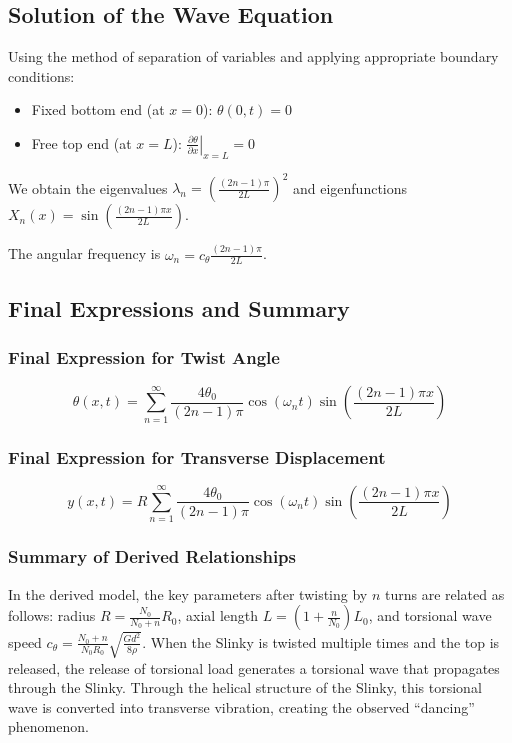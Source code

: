 \documentclass{mcmthesis}  %
\begin{document}
\subsection{Solution of the Wave Equation}
Using the method of separation of variables and applying appropriate boundary conditions:
\begin{itemize}
    \item Fixed bottom end (at \(x=0\)): \(\theta(0,t) = 0\)
    \item Free top end (at \(x=L\)): \(\left. \frac{\partial \theta}{\partial x} \right|_{x=L} = 0\)
\end{itemize}

We obtain the eigenvalues \(\lambda_n = \left(\frac{(2n-1)\pi}{2L}\right)^2\) and eigenfunctions \(X_n(x) = \sin\left(\frac{(2n-1)\pi x}{2L}\right)\).

The angular frequency is \(\omega_n = c_{\theta} \frac{(2n-1)\pi}{2L}\).

\subsection{Final Expressions and Summary}

\subsubsection{Final Expression for Twist Angle}
\begin{equation}
\theta(x,t) = \sum_{n=1}^{\infty} \frac{4\theta_0}{(2n-1)\pi} \cos(\omega_n t) \sin\left(\frac{(2n-1)\pi x}{2L}\right)
\end{equation}

\subsubsection{Final Expression for Transverse Displacement}
\begin{equation}
y(x,t) = R \sum_{n=1}^{\infty} \frac{4\theta_0}{(2n-1)\pi} \cos(\omega_n t) \sin\left(\frac{(2n-1)\pi x}{2L}\right)
\end{equation}

\subsubsection{Summary of Derived Relationships}
In the derived model, the key parameters after twisting by \(n\) turns are related as follows: radius $R = \frac{N_0}{N_0+n} R_0$, axial length $L = \left(1 + \frac{n}{N_0}\right) L_0$, and torsional wave speed $c_{\theta} = \frac{N_0+n}{N_0 R_0} \sqrt{\frac{G d^2}{8 \rho}}$. When the Slinky is twisted multiple times and the top is released, the release of torsional load generates a torsional wave that propagates through the Slinky. Through the helical structure of the Slinky, this torsional wave is converted into transverse vibration, creating the observed ``dancing'' phenomenon.
\end{document}
